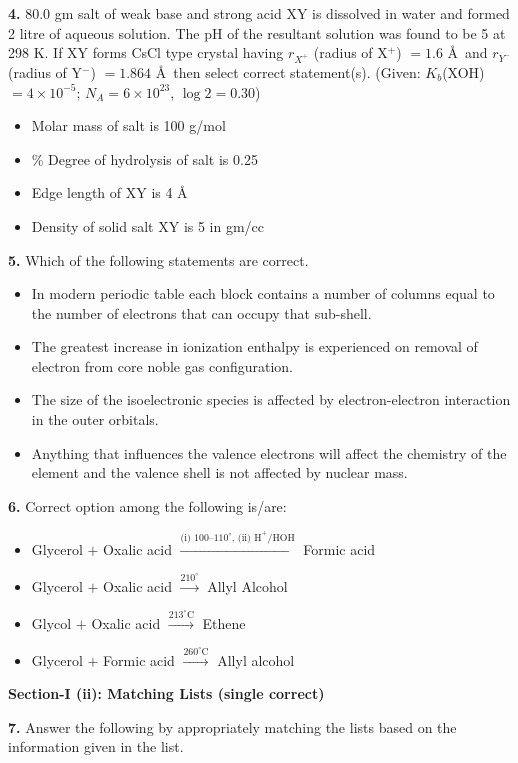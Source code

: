 \documentclass[10pt,twocolumn]{extarticle}
\newenvironment{qoptions}{\begin{itemize}[leftmargin=1.8em,itemsep=2pt,topsep=2pt,label={}]}{\end{itemize}}
\newcommand{\opt}[2]{\item[({#1})] {#2}}
\newcommand{\subsectionhdr}[1]{\par\vspace{3pt}\noindent\textbf{#1}\par\vspace{2pt}}
\begin{document}
\textbf{4.} 80.0 gm salt of weak base and strong acid XY is dissolved in water and formed 2 litre of aqueous solution. The pH of the resultant solution was found to be 5 at 298 K. If XY forms CsCl type crystal having $r_{X^+}$ (radius of X$^+$) $=1.6$ \AA\ and $r_{Y^-}$ (radius of Y$^-$) $=1.864$ \AA\ then select correct statement(s). (Given: $K_b$(XOH) $=4\times10^{-5}$; $N_A=6\times10^{23}$, $\log 2=0.30$)
\begin{qoptions}
\opt{A}{Molar mass of salt is 100 g/mol}
\opt{B}{\% Degree of hydrolysis of salt is 0.25}
\opt{C}{Edge length of XY is 4 \AA}
\opt{D}{Density of solid salt XY is 5 in gm/cc}
\end{qoptions}

\textbf{5.} Which of the following statements are correct.
\begin{qoptions}
\opt{A}{In modern periodic table each block contains a number of columns equal to the number of electrons that can occupy that sub-shell.}
\opt{B}{The greatest increase in ionization enthalpy is experienced on removal of electron from core noble gas configuration.}
\opt{C}{The size of the isoelectronic species is affected by electron-electron interaction in the outer orbitals.}
\opt{D}{Anything that influences the valence electrons will affect the chemistry of the element and the valence shell is not affected by nuclear mass.}
\end{qoptions}

\textbf{6.} Correct option among the following is/are:
\begin{qoptions}
\opt{A}{Glycerol $+$ Oxalic acid $\xrightarrow{\text{(i) }100\text{--}110^{\circ}\text{, (ii) H}^+/\text{HOH}}$ Formic acid}
\opt{B}{Glycerol $+$ Oxalic acid $\xrightarrow{210^{\circ}}$ Allyl Alcohol}
\opt{C}{Glycol $+$ Oxalic acid $\xrightarrow{213^{\circ}\text{C}}$ Ethene}
\opt{D}{Glycerol $+$ Formic acid $\xrightarrow{260^{\circ}\text{C}}$ Allyl alcohol}
\end{qoptions}

\subsectionhdr{Section-I (ii): Matching Lists (single correct)}

\textbf{7.} Answer the following by appropriately matching the lists based on the information given in the list.
\end{document}
